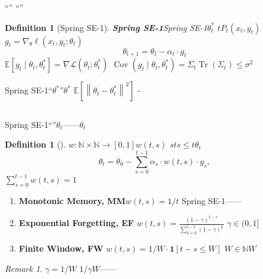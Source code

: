 \documentclass[11pt,a4paper]{article}
\newtheorem{definition}[theorem]{Definition}
\theoremstyle{remark}
\newtheorem{remark}[theorem]{Remark}
\DeclareMathOperator{\Cov}{Cov}
\DeclareMathOperator{\Tr}{Tr}
\newcommand{\N}{\mathbb{N}}
\newcommand{\E}{\mathbb{E}}
\newcommand{\norm}[1]{\left\lVert#1\right\rVert}
\begin{document}
``''
``''


\begin{definition}[Spring SE-1]\label{def:spring_temporal}
\textbf{Spring SE-1}Spring SE-1$\theta_t^*$
$t$$P_t$$(x_t, y_t)$
$g_t = \nabla_\theta \ell(x_t, y_t; \theta_t)$
\begin{equation}
    \theta_{t+1} = \theta_t - \alpha_t \cdot g_t
\end{equation}
$\E[g_t \mid \theta_t, \theta_t^*] = \nabla\mathcal{L}(\theta_t; \theta_t^*)$
$\Cov(g_t \mid \theta_t, \theta_t^*) = \Sigma_t$$\Tr(\Sigma_t) \leq \sigma^2$
\end{definition}

Spring SE-1``$\theta^*$''$\theta^*$
\textbf{}$\E[\norm{\theta_t - \theta_t^*}^2]$
-

\subsection{}

Spring SE-1``''$\theta_t$——$\theta_t$
\textbf{}

\begin{definition}[]\label{def:forgetting_strategy}
\textbf{}$w: \N \times \N \to [0, 1]$$w(t, s)$
$s$$t$$s \leq t$$\theta_t$
\begin{equation}
    \theta_t = \theta_0 - \sum_{s=0}^{t-1} \alpha_s \cdot w(t, s) \cdot g_s,
\end{equation}
$\sum_{s=0}^{t-1} w(t, s) = 1$
\end{definition}



\begin{enumerate}[label=(\arabic*)]
    \item \textbf{Monotonic Memory, MM}$w(t, s) = 1/t$
          Spring SE-1——
    \item \textbf{Exponential Forgetting, EF}
          $w(t, s) = \frac{(1-\gamma)^{t-s}}{\sum_{k=0}^{t-1} (1-\gamma)^k}$
          $\gamma \in (0, 1]$
    \item \textbf{Finite Window, FW}
          $w(t, s) = 1/W \cdot \mathbf{1}[t-s \leq W]$
          $W \in \N$$W$
\end{enumerate}

\begin{remark}
$\gamma = 1/W$
$1/\gamma$$W$——

\end{remark}

\end{document}
